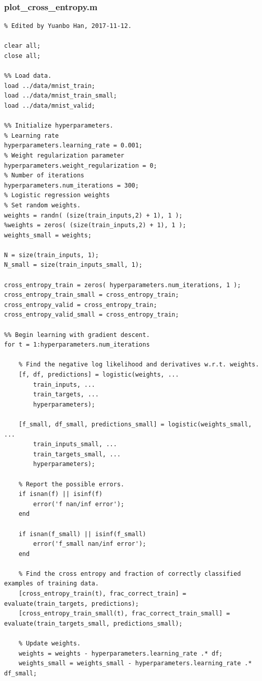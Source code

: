 \documentclass{article}
\begin{document}
\subsubsection{plot\_cross\_entropy.m}
\begin{lstlisting}
% Edited by Yuanbo Han, 2017-11-12.

clear all;
close all;

%% Load data.
load ../data/mnist_train;
load ../data/mnist_train_small;
load ../data/mnist_valid;

%% Initialize hyperparameters.
% Learning rate
hyperparameters.learning_rate = 0.001;
% Weight regularization parameter
hyperparameters.weight_regularization = 0;
% Number of iterations
hyperparameters.num_iterations = 300;
% Logistic regression weights
% Set random weights.
weights = randn( (size(train_inputs,2) + 1), 1 );
%weights = zeros( (size(train_inputs,2) + 1), 1 );
weights_small = weights;

N = size(train_inputs, 1);
N_small = size(train_inputs_small, 1);

cross_entropy_train = zeros( hyperparameters.num_iterations, 1 );
cross_entropy_train_small = cross_entropy_train;
cross_entropy_valid = cross_entropy_train;
cross_entropy_valid_small = cross_entropy_train;

%% Begin learning with gradient descent.
for t = 1:hyperparameters.num_iterations
    
    % Find the negative log likelihood and derivatives w.r.t. weights.
    [f, df, predictions] = logistic(weights, ...
        train_inputs, ...
        train_targets, ...
        hyperparameters);
    
    [f_small, df_small, predictions_small] = logistic(weights_small, ...
        train_inputs_small, ...
        train_targets_small, ...
        hyperparameters);
    
    % Report the possible errors.
    if isnan(f) || isinf(f)
        error('f nan/inf error');
    end
    
    if isnan(f_small) || isinf(f_small)
        error('f_small nan/inf error');
    end
    
    % Find the cross entropy and fraction of correctly classified examples of training data.
    [cross_entropy_train(t), frac_correct_train] = evaluate(train_targets, predictions);
    [cross_entropy_train_small(t), frac_correct_train_small] = evaluate(train_targets_small, predictions_small);
    
    % Update weights.
    weights = weights - hyperparameters.learning_rate .* df;
    weights_small = weights_small - hyperparameters.learning_rate .* df_small;
    

\end{lstlisting}
\end{document}
